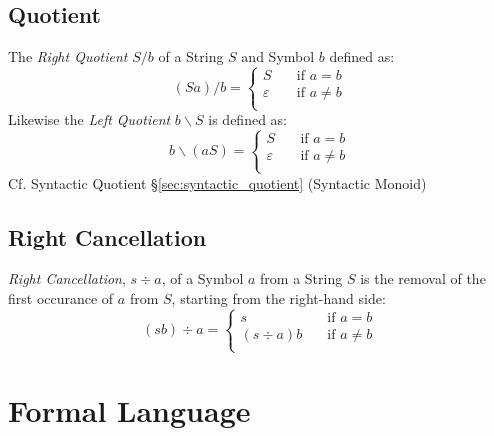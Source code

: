 \subsection{Quotient}\label{sec:string_quotient}

The \emph{Right Quotient} $S / b$ of a String $S$ and Symbol $b$
defined as:
\[
  (Sa)/b =
  \begin{cases}
    S           & \quad \text{if $a = b$}\\
    \varepsilon & \quad \text{if $a \neq b$}\\
  \end{cases}
\]
Likewise the \emph{Left Quotient} $b \backslash S$ is defined as:
\[
  b\backslash(aS) =
  \begin{cases}
    S           & \quad \text{if $a = b$}\\
    \varepsilon & \quad \text{if $a \neq b$}\\
  \end{cases}
\]
\HandRight\; Cf. Syntactic Quotient \S\ref{sec:syntactic_quotient}
(Syntactic Monoid)



\subsection{Right Cancellation}\label{sec:right_cancellation}

\emph{Right Cancellation}, $s \div a$, of a Symbol $a$ from a String
$S$ is the removal of the first occurance of $a$ from $S$, starting
from the right-hand side:
\[
  (sb) \div a =
  \begin{cases}
    s           & \quad \text{if $a = b$}\\
    (s \div a)b & \quad \text{if $a \neq b$}\\
  \end{cases}
\]



\section{Formal Language}\label{sec:formal_language}

